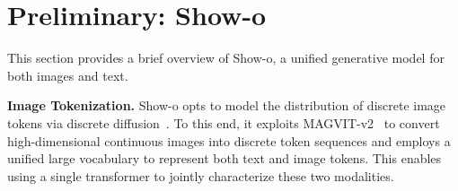 
\section{Preliminary: Show-o}
\label{sec:pre}
This section provides a brief overview of Show-o, a unified generative model for both images and text.%


\noindent \textbf{Image Tokenization.}
Show-o opts to model the distribution of discrete image tokens via discrete diffusion~\cite{austin2021structured}. 
To this end, it exploits MAGVIT-v2~\cite{yu2023language} to convert high-dimensional continuous images into discrete token sequences and employs a unified large vocabulary to represent both text and image tokens. 
This enables using a single transformer to jointly characterize these two modalities.

